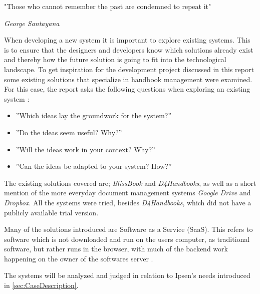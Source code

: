 \documentclass[../../master.tex]{subfiles}
\begin{document}
\epigraph{"Those who cannot remember the past are condemned to repeat it"}{\textit{George Santayana}}
When developing a new system it is important to explore existing systems.
This is to ensure that the designers and developers know which solutions already exist and thereby how the future solution is going to fit into the technological landscape.
To get inspiration for the development project discussed in this report some existing solutions that specialize in handbook management were examined.
For this case, the report asks the following questions when exploring an existing system \citep[p.~33]{Rod-Aalborg}:

\begin{itemize}
  \item ''Which ideas lay the groundwork for the system?''
  \item ''Do the ideas seem useful? Why?''
  \item ''Will the ideas work in your context? Why?''
  \item ''Can the ideas be adapted to your system? How?''
\end{itemize}

The existing solutions covered are; \textit{BlissBook} and \textit{D4Handbooks}, as well as a short mention of the more everyday document management systems \textit{Google Drive} and \textit{Dropbox}.
All the systems were tried, besides \textit{D4Handbooks}, which did not have a publicly available trial version.

Many of the solutions introduced are Software as a Service (SaaS).
This refers to software which is not downloaded and run on the users computer, as traditional software, but rather runs in the browser, with much of the backend work happening on the owner of the softwares server \cite{saas}.

The systems will be analyzed and judged in relation to Ipsen's needs introduced in \cref{sec:CaseDescription}.
\end{document}
